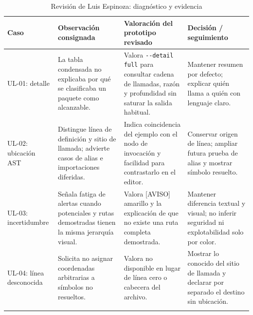 \begin{table}[H]
\centering\small{}
\caption{Revisión de Luis Espinoza: diagnóstico y evidencia}
\begin{tabularx}{\textwidth}{P{2.3cm}YYP{3.1cm}}
\toprule
\textbf{Caso} & \textbf{Observación consignada} & \textbf{Valoración del prototipo revisado} & \textbf{Decisión / seguimiento} \\
\midrule
UL-01: detalle & La tabla condensada no explicaba por qué se clasificaba un paquete como alcanzable. & Valora \texttt{-\allowbreak -\allowbreak detail full} para consultar cadena de llamadas, razón y profundidad sin saturar la salida habitual. & Mantener resumen por defecto; explicar quién llama a quién con lenguaje claro. \\
\addlinespace
UL-02: ubicación AST & Distingue línea de definición y sitio de llamada; advierte casos de alias e importaciones diferidas. & Indica coincidencia del ejemplo con el nodo de invocación y facilidad para contrastarlo en el editor. & Conservar origen de línea; ampliar futura prueba de alias y mostrar símbolo resuelto. \\
\addlinespace
UL-03: incertidumbre & Señala fatiga de alertas cuando potenciales y rutas demostradas tienen la misma jerarquía visual. & Valora [AVISO] amarillo y la explicación de que no existe una ruta completa demostrada. & Mantener diferencia textual y visual; no inferir seguridad ni explotabilidad solo por color. \\
\addlinespace
UL-04: línea desconocida & Solicita no asignar coordenadas arbitrarias a símbolos no resueltos. & Valora no disponible en lugar de línea cero o cabecera del archivo. & Mostrar lo conocido del sitio de llamada y declarar por separado el destino sin ubicación. \\
\addlinespace
\bottomrule
\end{tabularx}
\end{table}


